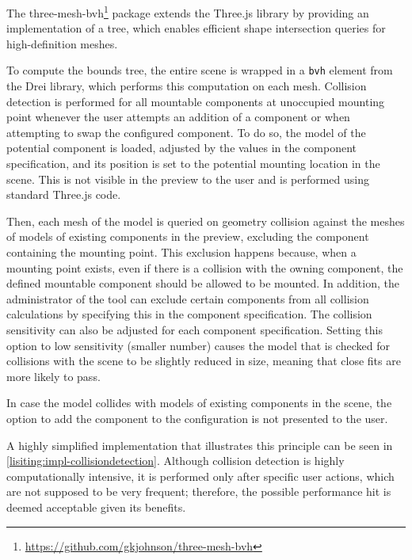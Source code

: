 The three-mesh-bvh\footnote{\url{https://github.com/gkjohnson/three-mesh-bvh}} package extends the Three.js library by providing an implementation of a  tree, which enables efficient shape intersection queries for high-definition meshes.~\cite{Johnson2023}

To compute the bounds tree, the entire scene is wrapped in a \texttt{bvh} element from the Drei library, which performs this computation on each mesh. Collision detection is performed for all mountable components at unoccupied mounting point whenever the user attempts an addition of a component or when attempting to swap the configured component. To do so, the model of the potential component is loaded, adjusted by the values in the component specification, and its position is set to the potential mounting location in the scene. This is not visible in the preview to the user and is performed using standard Three.js code. 

Then, each mesh of the model is queried on geometry collision against the meshes of models of existing components in the preview, excluding the component containing the mounting point. This exclusion happens because, when a mounting point exists, even if there is a collision with the owning component, the defined mountable component should be allowed to be mounted. In addition, the administrator of the tool can exclude certain components from all collision calculations by specifying this in the component specification. The collision sensitivity can also be adjusted for each component specification. Setting this option to low sensitivity (smaller number) causes the model that is checked for collisions with the scene to be slightly reduced in size, meaning that close fits are more likely to pass.

In case the model collides with models of existing components in the scene, the option to add the component to the configuration is not presented to the user.

A highly simplified implementation that illustrates this principle can be seen in \autoref{lisiting:impl-collisiondetection}. Although collision detection is highly computationally intensive, it is performed only after specific user actions, which are not supposed to be very frequent; therefore, the possible performance hit is deemed acceptable given its benefits.

